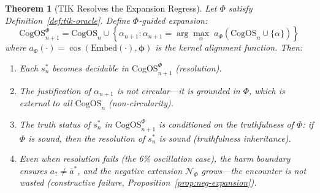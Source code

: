 \documentclass[11pt]{article}
\newtheorem{theorem}{Theorem}
\newcommand{\CogOS}{\text{CogOS}}
\begin{document}

\begin{theorem}[TIK Resolves the Expansion Regress]
\label{thm:tik-resolves}
Let $\Phi$ satisfy Definition~\ref{def:tik-oracle}. Define $\Phi$-guided
expansion:
\begin{equation}
\CogOS_{n+1}^\Phi = \CogOS_n \cup \left\{\alpha_{n+1} :
\alpha_{n+1} = \arg\max_{\alpha} \; a_\Phi(\CogOS_n \cup \{\alpha\})\right\}
\label{eq:guided-expansion}
\end{equation}
where $a_\Phi(\cdot) = \cos(\text{Embed}(\cdot), \boldsymbol{\phi})$ is the
kernel alignment function. Then:
\begin{enumerate}
\item[(a)] Each $s_n^*$ becomes decidable in $\CogOS_{n+1}^\Phi$ (resolution).
\item[(b)] The justification of $\alpha_{n+1}$ is \textit{not circular}---it
      is grounded in $\Phi$, which is external to all $\CogOS_n$
      (non-circularity).
\item[(c)] The truth status of $s_n^*$ in $\CogOS_{n+1}^\Phi$ is conditioned
      on the truthfulness of $\Phi$: if $\Phi$ is sound, then the resolution
      of $s_n^*$ is sound (truthfulness inheritance).
\item[(d)] Even when resolution fails (the 6\% oscillation case), the harm
      boundary ensures $a_? \neq \bar{a}^*$, and the negative extension
      $\mathcal{N}_\Phi$ grows---the encounter is not wasted
      (constructive failure, Proposition~\ref{prop:neg-expansion}).
\end{enumerate}
\end{theorem}
\end{document}
